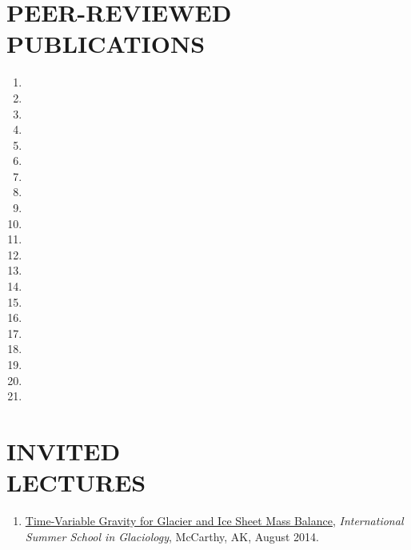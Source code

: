\documentclass[margin,line,11pt]{res}
\begin{document}
\begin{resume}
\section{PEER-REVIEWED\\ PUBLICATIONS}
	\begin{enumerate}
		\setlength{\itemindent}{-3ex}
		\item {}
		\item {}
		\item {}
		\item {}
		\item {}
		\item {}
		\item {}
		\item {}
		\item {}
		\item {}
		\item {}
		\item {}
		\item {}
		\item {}
		\item {}
		\item {}
		\item {}
		\item {}
		\item {}
		\item {}
		\item {}
	\end{enumerate}

\section{INVITED\\ LECTURES}
	\begin{enumerate}
		\setlength{\itemindent}{-3ex}
		\item \href{http://glaciers.gi.alaska.edu/sites/default/files/Lecture_GRACE_Sutterley2014.pdf}{Time-Variable Gravity for Glacier and Ice Sheet Mass Balance}, {\em International Summer School in Glaciology}, McCarthy, AK, August 2014.
	\end{enumerate}


\end{resume}
\end{document}
